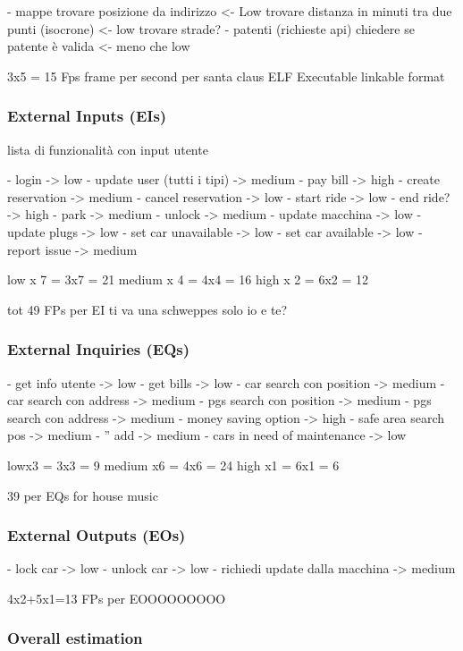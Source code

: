 \documentclass[english]{article}
\begin{document}
- mappe
trovare posizione da indirizzo <- Low
trovare distanza in minuti tra due punti (isocrone) <- low
trovare strade?
- patenti (richieste api)
chiedere se patente è valida <- meno che low

3x5 = 15 Fps frame per second per santa claus ELF Executable linkable format

\subsubsection{External Inputs (EIs)}

lista di funzionalità con input utente

- login -> low
- update user (tutti i tipi) -> medium
- pay bill -> high
- create reservation -> medium
- cancel reservation -> low
- start ride -> low
- end ride? -> high
- park -> medium 
- unlock -> medium
- update macchina -> low
- update plugs -> low
- set car unavailable -> low
- set car available -> low
- report issue -> medium

low x 7 = 3x7 = 21
medium x 4 = 4x4 = 16
high x 2 = 6x2 = 12

tot 49 FPs per EI ti va una schweppes solo io e te?


\subsubsection{External Inquiries (EQs)}

- get info utente -> low
- get bills -> low
- car search con position -> medium
- car search con address -> medium
- pgs search con position -> medium
- pgs search con address -> medium
- money saving option -> high
- safe area search pos -> medium
- '' add -> medium
- cars in need of maintenance -> low

lowx3 = 3x3 = 9
medium x6 = 4x6 = 24
high x1 = 6x1 = 6

39 per EQs for house music

\subsubsection{External Outputs (EOs)}

- lock car -> low
- unlock car -> low
- richiedi update dalla macchina -> medium

4x2+5x1=13 FPs per EOOOOOOOOO

\subsubsection{Overall estimation}
\end{document}
